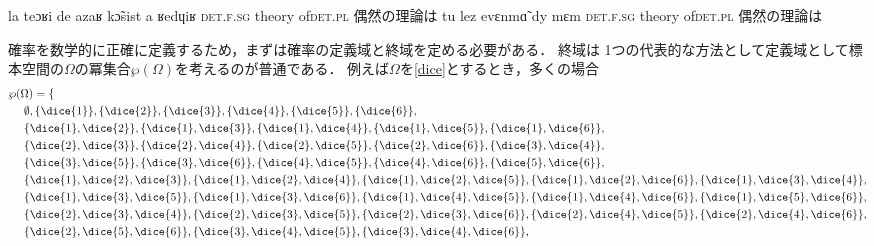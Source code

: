 \documentclass[main.tex]{subfiles}
\begin{document}
         {la teɔʁi de azaʁ {k\~{ɔ}sist\liaison} a ʁedɥiʁ}
         {\textsc{det}.\textsc{f}.\textsc{sg} theory of\shortunderscore\textsc{det}.\textsc{pl}}
         {偶然の理論は}
         {tu lez evɛnm\~{ɑ} dy mɛm}
         {\textsc{det}.\textsc{f}.\textsc{sg} theory of\shortunderscore\textsc{det}.\textsc{pl}}
         {偶然の理論は}

確率を数学的に正確に定義するため，まずは確率の定義域と終域を定める必要がある．
終域は
1つの代表的な方法として定義域として標本空間の\(\Omega\)の冪集合\(\wp(\Omega)\)を考えるのが普通である．
例えば\(\Omega\)を\eqref{dice}とするとき，多くの場合
\begin{align*}
    & \wp(\Omega) = \{ \\
    & \ \ \ \ \emptyset, \{\dice{1}\}, \{\dice{2}\}, \{\dice{3}\}, \{\dice{4}\}, \{\dice{5}\}, \{\dice{6}\}, \\
    & \ \ \ \ 
        \{\dice{1}, \dice{2}\},
        \{\dice{1}, \dice{3}\},
        \{\dice{1}, \dice{4}\},
        \{\dice{1}, \dice{5}\},
        \{\dice{1}, \dice{6}\}, \\
    & \ \ \ \ 
        \{\dice{2}, \dice{3}\},
        \{\dice{2}, \dice{4}\},
        \{\dice{2}, \dice{5}\},
        \{\dice{2}, \dice{6}\},
        \{\dice{3}, \dice{4}\}, \\
    & \ \ \ \ 
        \{\dice{3}, \dice{5}\},
        \{\dice{3}, \dice{6}\},
        \{\dice{4}, \dice{5}\},
        \{\dice{4}, \dice{6}\},
        \{\dice{5}, \dice{6}\}, \\
    & \ \ \ \ 
        \{\dice{1}, \dice{2}, \dice{3}\},
        \{\dice{1}, \dice{2}, \dice{4}\},
        \{\dice{1}, \dice{2}, \dice{5}\},
        \{\dice{1}, \dice{2}, \dice{6}\},
        \{\dice{1}, \dice{3}, \dice{4}\}, \\
    & \ \ \ \ 
        \{\dice{1}, \dice{3}, \dice{5}\},
        \{\dice{1}, \dice{3}, \dice{6}\},
        \{\dice{1}, \dice{4}, \dice{5}\},
        \{\dice{1}, \dice{4}, \dice{6}\},
        \{\dice{1}, \dice{5}, \dice{6}\}, \\
    & \ \ \ \ 
        \{\dice{2}, \dice{3}, \dice{4}\},
        \{\dice{2}, \dice{3}, \dice{5}\},
        \{\dice{2}, \dice{3}, \dice{6}\},
        \{\dice{2}, \dice{4}, \dice{5}\},
        \{\dice{2}, \dice{4}, \dice{6}\}, \\
    & \ \ \ \ 
        \{\dice{2}, \dice{5}, \dice{6}\},
        \{\dice{3}, \dice{4}, \dice{5}\},
        \{\dice{3}, \dice{4}, \dice{6}\},

\end{align*}
\end{document}
